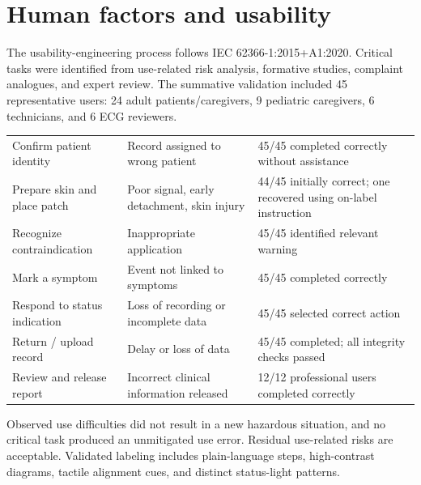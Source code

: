 \section{Human factors and usability}

The usability-engineering process follows IEC 62366-1:2015+A1:2020. Critical tasks were identified from use-related risk analysis, formative studies, complaint analogues, and expert review. The summative validation included 45 representative users: 24 adult patients/caregivers, 9 pediatric caregivers, 6 technicians, and 6 ECG reviewers.

\begin{tabularx}{\textwidth}{@{}L{1.65in}Y Y@{}}
\toprule
{} &  &  \\
\midrule
Confirm patient identity & Record assigned to wrong patient & 45/45 completed correctly without assistance \\
Prepare skin and place patch & Poor signal, early detachment, skin injury & 44/45 initially correct; one recovered using on-label instruction \\
Recognize contraindication & Inappropriate application & 45/45 identified relevant warning \\
Mark a symptom & Event not linked to symptoms & 45/45 completed correctly \\
Respond to status indication & Loss of recording or incomplete data & 45/45 selected correct action \\
Return / upload record & Delay or loss of data & 45/45 completed; all integrity checks passed \\
Review and release report & Incorrect clinical information released & 12/12 professional users completed correctly \\
\bottomrule
\end{tabularx}

Observed use difficulties did not result in a new hazardous situation, and no critical task produced an unmitigated use error. Residual use-related risks are acceptable. Validated labeling includes plain-language steps, high-contrast diagrams, tactile alignment cues, and distinct status-light patterns.

